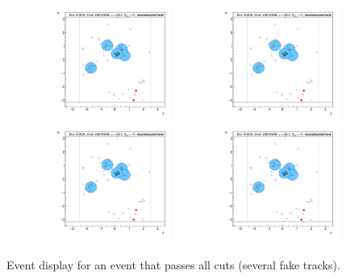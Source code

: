 \begin{figure}[h!]
  \centering
  \includegraphics[page=81,width=0.48\textwidth]{figures/EventDisplays.pdf}
  \includegraphics[page=82,width=0.48\textwidth]{figures/EventDisplays.pdf} \\
  \includegraphics[page=84,width=0.48\textwidth]{figures/EventDisplays.pdf}
  \includegraphics[page=85,width=0.48\textwidth]{figures/EventDisplays.pdf}
  \caption{Event display for an event that passes all cuts (several fake tracks).}
  \label{fig:event-display-5}
\end{figure}

